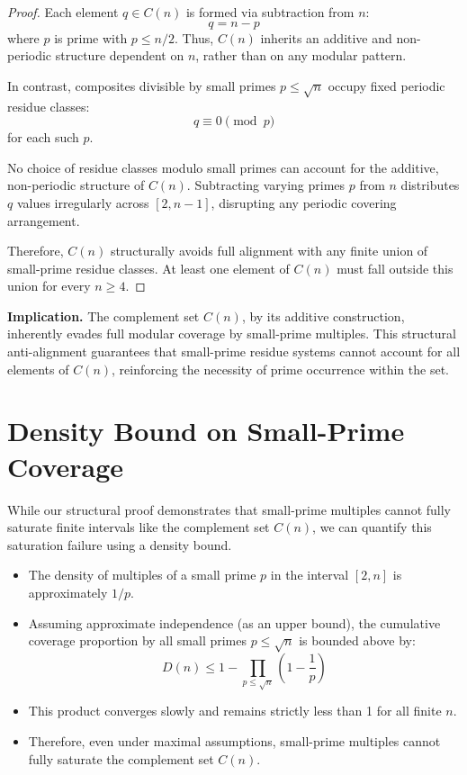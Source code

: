 \documentclass[11pt]{article}
\begin{document}
	\begin{proof}
		Each element \( q \in C(n) \) is formed via subtraction from \( n \):
		\[
		q = n - p
		\]
		where \( p \) is prime with \( p \leq n/2 \). Thus, \( C(n) \) inherits an additive and non-periodic structure dependent on \( n \), rather than on any modular pattern.
		
		In contrast, composites divisible by small primes \( p \leq \sqrt{n} \) occupy fixed periodic residue classes:
		\[
		q \equiv 0 \pmod{p}
		\]
		for each such \( p \).
		
		No choice of residue classes modulo small primes can account for the additive, non-periodic structure of \( C(n) \). Subtracting varying primes \( p \) from \( n \) distributes \( q \) values irregularly across \([2, n-1]\), disrupting any periodic covering arrangement.
		
		Therefore, \( C(n) \) structurally avoids full alignment with any finite union of small-prime residue classes. At least one element of \( C(n) \) must fall outside this union for every \( n \geq 4 \).
	\end{proof}
	
	\textbf{Implication.}  
	The complement set \( C(n) \), by its additive construction, inherently evades full modular coverage by small-prime multiples. This structural anti-alignment guarantees that small-prime residue systems cannot account for all elements of \( C(n) \), reinforcing the necessity of prime occurrence within the set.
	
	
	
	\section{Density Bound on Small-Prime Coverage}
	
	While our structural proof demonstrates that small-prime multiples cannot fully saturate finite intervals like the complement set \( C(n) \), we can quantify this saturation failure using a density bound.
	
	\begin{itemize}
		\item The density of multiples of a small prime \( p \) in the interval \([2, n]\) is approximately \( 1/p \).
		\item Assuming approximate independence (as an upper bound), the cumulative coverage proportion by all small primes \( p \leq \sqrt{n} \) is bounded above by:
		\[
		D(n) \leq 1 - \prod_{p \leq \sqrt{n}} \left(1 - \frac{1}{p}\right)
		\]
		\item This product converges slowly and remains strictly less than 1 for all finite \( n \).
		\item Therefore, even under maximal assumptions, small-prime multiples cannot fully saturate the complement set \( C(n) \).
	\end{itemize}
	
\end{document}
